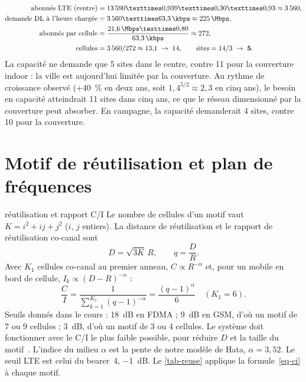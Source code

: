 \begin{align}
  \text{abonnés LTE (centre)} &= \num{13590} × 0{,}939 × 0{,}30 × 0{,}93 \approx \num{3560}, \\
  \text{demande DL à l'heure chargée} &= \num{3560} × \SI{63,3}{\kbps} \approx \SI{225}{\Mbps}, \\
  \text{abonnés par cellule} &= \frac{\SI{21,6}{\Mbps} × 0{,}80}{\SI{63,3}{\kbps}} \approx 272, \\
  \text{cellules} &= \num{3560} / 272 \approx 13{,}1 \;\rightarrow\; 14, \qquad \text{sites} = 14 / 3 \;\rightarrow\; \mathbf{5}.
\end{align}
La capacité ne demande que 5 sites dans le centre, contre 11 pour la couverture indoor : la ville est aujourd'hui limitée par la couverture. Au rythme de croissance observé (+\SI{40}{\percent} en deux ans, soit $1{,}4^{5/2} \approx 2{,}3$ en cinq ans), le besoin en capacité atteindrait 11 sites dans cinq ans, ce que le réseau dimensionné par la couverture peut absorber. En campagne, la capacité demanderait 4 sites, contre 10 pour la couverture.

\section{Motif de réutilisation et plan de fréquences}
\label{sec-reuse}

\begin{cours}{réutilisation et rapport C/I}
Le nombre de cellules d'un motif vaut $K = i^2 + ij + j^2$ ($i$, $j$ entiers). La distance de réutilisation et le rapport de réutilisation co-canal sont
\begin{equation}
  D = \sqrt{3K}\,R, \qquad q = \frac{D}{R}.
\end{equation}
Avec $K_1$ cellules co-canal au premier anneau, $C \propto R^{-\alpha}$ et, pour un mobile en bord de cellule, $I_k \propto (D - R)^{-\alpha}$ :
\begin{equation}
  \frac{C}{I} = \frac{1}{\sum_{k=1}^{K_1} (q - 1)^{-\alpha}} = \frac{(q - 1)^{\alpha}}{6} \quad (K_1 = 6).
  \label{eq-ci}
\end{equation}
Seuils donnés dans le cours : \SI{18}{\deci\bel} en FDMA ; \SI{9}{\deci\bel} en GSM, d'où un motif de 7 ou 9 cellules ; \SI{3}{\deci\bel}, d'où un motif de 3 ou 4 cellules. Le système doit fonctionner avec le C/I le plus faible possible, pour réduire $D$ et la taille du motif~\cite{afif2026cours}.
\application L'indice du milieu $\alpha$ est la pente de notre modèle de Hata, $\alpha = 3{,}52$. Le seuil LTE est celui du bearer~4, \SI{-1}{\deci\bel}. Le \cref{tab-reuse} applique la formule~\eqref{eq-ci} à chaque motif.
\end{cours}

